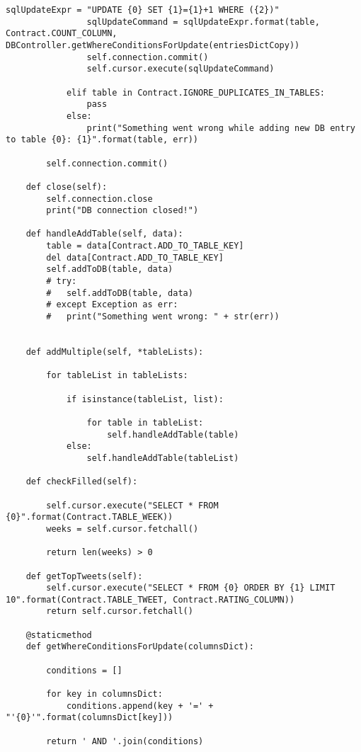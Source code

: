 \begin{itemize}
\begin{lstlisting}[style=py]
				sqlUpdateExpr = "UPDATE {0} SET {1}={1}+1 WHERE ({2})"
				sqlUpdateCommand = sqlUpdateExpr.format(table, Contract.COUNT_COLUMN, DBController.getWhereConditionsForUpdate(entriesDictCopy))
				self.connection.commit()
				self.cursor.execute(sqlUpdateCommand)

			elif table in Contract.IGNORE_DUPLICATES_IN_TABLES:
				pass
			else:
				print("Something went wrong while adding new DB entry to table {0}: {1}".format(table, err))

		self.connection.commit()

	def close(self):
		self.connection.close
		print("DB connection closed!")

	def handleAddTable(self, data):
		table = data[Contract.ADD_TO_TABLE_KEY]
		del data[Contract.ADD_TO_TABLE_KEY]
		self.addToDB(table, data)
		# try:
		# 	self.addToDB(table, data)
		# except Exception as err:
		# 	print("Something went wrong: " + str(err))


	def addMultiple(self, *tableLists):
		
		for tableList in tableLists:

			if isinstance(tableList, list):

				for table in tableList:
					self.handleAddTable(table)
			else:
				self.handleAddTable(tableList)

	def checkFilled(self):

		self.cursor.execute("SELECT * FROM {0}".format(Contract.TABLE_WEEK))
		weeks = self.cursor.fetchall()

		return len(weeks) > 0

	def getTopTweets(self):
		self.cursor.execute("SELECT * FROM {0} ORDER BY {1} LIMIT 10".format(Contract.TABLE_TWEET, Contract.RATING_COLUMN))
		return self.cursor.fetchall()

	@staticmethod
	def getWhereConditionsForUpdate(columnsDict):
		
		conditions = []

		for key in columnsDict:
			conditions.append(key + '=' + "'{0}'".format(columnsDict[key]))

		return ' AND '.join(conditions)


\end{lstlisting}

\end{itemize}


